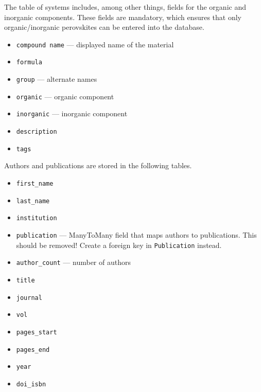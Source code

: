 \documentclass{article}
\begin{document}
The table of systems includes, among other things, fields for the organic and inorganic components. These fields are mandatory, which ensures that only organic/inorganic perovskites can be entered into the database.
\begin{tcolorbox}[colback=green!5,colframe=green!40!black,title=System(Base)]
  \begin{itemize}
  \item \texttt{compound name} --- displayed name of the material
  \item \texttt{formula}
  \item \texttt{group} --- alternate names
  \item \texttt{organic} --- organic component
  \item \texttt{inorganic} --- inorganic component
  \item \texttt{description}
  \item \texttt{tags}
  \end{itemize}
\end{tcolorbox}

Authors and publications are stored in the following tables.
\begin{tcolorbox}[colback=green!5,colframe=green!40!black,title=Author(Base)]
  \begin{itemize}
  \item \texttt{first\_name}
  \item \texttt{last\_name}
  \item \texttt{institution}
  \item \texttt{publication} --- ManyToMany field that maps authors to publications. This should be removed! Create a foreign key in \texttt{Publication} instead.
  \end{itemize}
\end{tcolorbox}
\begin{tcolorbox}[colback=green!5,colframe=green!40!black,title=Publication(Base)]
  \begin{itemize}
  \item \texttt{author\_count} --- number of authors
  \item \texttt{title}
  \item \texttt{journal}
  \item \texttt{vol}
  \item \texttt{pages\_start}
  \item \texttt{pages\_end}
  \item \texttt{year}
  \item \texttt{doi\_isbn}
  \end{itemize}
\end{tcolorbox}
\end{document}
